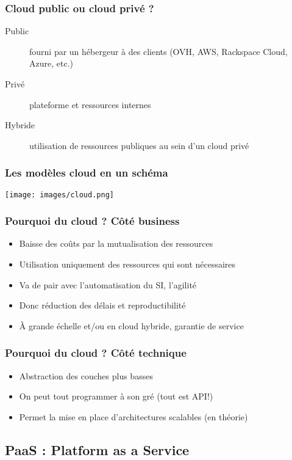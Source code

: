   \begin{frame}
    \frametitle{Cloud public ou cloud privé ?}
    \begin{description}
      \item[Public] fourni par un hébergeur à des clients (OVH, AWS, Rackspace Cloud, Azure, etc.)
      \item[Privé] plateforme et ressources internes
      \item[Hybride] utilisation de ressources publiques au sein d'un cloud privé
    \end{description}
  \end{frame}

  \begin{frame}
    \frametitle{Les modèles cloud en un schéma}
    \texttt{[image: images/cloud.png]}
  \end{frame}

  \begin{frame}
    \frametitle{Pourquoi du cloud ? Côté business}
    \begin{itemize}
      \item Baisse des coûts par la mutualisation des ressources
      \item Utilisation uniquement des ressources qui sont nécessaires
      \item Va de pair avec l'automatisation du SI, l'agilité
      \item Donc réduction des délais et reproductibilité
      \item À grande échelle et/ou en cloud hybride, garantie de service
    \end{itemize}
  \end{frame}

  \begin{frame}
    \frametitle{Pourquoi du cloud ? Côté technique}
    \begin{itemize}
      \item Abstraction des couches plus basses
      \item On peut tout programmer à son gré (tout est API!)
      \item Permet la mise en place d'architectures scalables (en théorie)
    \end{itemize}
  \end{frame}

  \subsection[PaaS]{PaaS : Platform as a Service}

